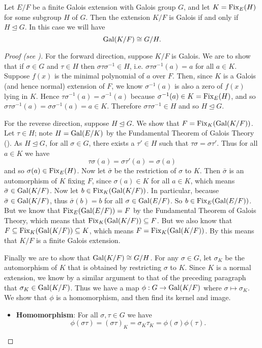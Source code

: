 \begin{theorem}\label{thrm-intermediate-field-that-is-galois-extension-of-base-field-iff-subgroup-is-normal}
    Let $E/F$ be a finite Galois extension with Galois group $G$, and let $K = \mathrm{Fix}_{E}(H)$ for some subgroup $H$ of $G$. Then the extension $K/F$ is Galois if and only if $H \unlhd G$. In this case we will have
    \[
        \mathrm{Gal}(K/F) \cong G/H.
    \]
\end{theorem}
\begin{proof}[Proof (see {\cite[Theorem 23.23, Statment 4]{judson_beezer_2022}})]
    For the forward direction, suppose $K/F$ is Galois. We are to show that if $\sigma \in G$ and $\tau \in H$ then $\sigma\tau\sigma^{-1} \in H$, i.e. $\sigma\tau\sigma^{-1}(a) = a$ for all $a \in K$. Suppose $f(x)$ is the minimal polynomial of $a$ over $F$. Then, since $K$ is a Galois (and hence normal) extension of $F$, we know $\sigma^{-1}(a)$ is also a zero of $f(x)$ lying in $K$. Hence $\tau\sigma^{-1}(a) = \sigma^{-1}(a)$ because $\sigma^{-1}(a) \in K = \mathrm{Fix}_{E}(H)$, and so $\sigma\tau\sigma^{-1}(a) = \sigma\sigma^{-1}(a) = a \in K$. Therefore $\sigma\tau\sigma^{-1} \in H$ and so $H \unlhd G$.

    For the reverse direction, suppose $H \unlhd G$. We show that $F = \mathrm{Fix}_{K}(\mathrm{Gal}(K/F))$. Let $\tau \in H$; note $H = \mathrm{Gal}(E/K)$ by the Fundamental Theorem of Galois Theory (). As $H \unlhd G$, for all $\sigma \in G$, there exists a $\tau' \in H$ such that $\tau\sigma = \sigma\tau'$. Thus for all $a \in K$ we have
    \[
        \tau\sigma(a) = \sigma\tau'(a) = \sigma(a)
    \]
    and so $\sigma(a) \in \mathrm{Fix}_{E}(H)$. Now let $\bar{\sigma}$ be the restriction of $\sigma$ to $K$. Then $\bar{\sigma}$ is an automorphism of $K$ fixing $F$, since $\sigma(a) \in K$ for all $a \in K$, which means $\bar{\sigma} \in \mathrm{Gal}(K/F)$. Now let $b \in \mathrm{Fix}_{K}(\mathrm{Gal}(K/F))$. In particular, because $\bar{\sigma} \in \mathrm{Gal}(K/F)$, thus $\bar{\sigma}(b) = b$ for all $\sigma \in \mathrm{Gal}(E/F)$. So $b \in \mathrm{Fix}_{E}(\mathrm{Gal}(E/F))$. But we know that $\mathrm{Fix}_{E}(\mathrm{Gal}(E/F)) = F$ by the Fundamental Theorem of Galois Theory, which means that $\mathrm{Fix}_{K}(\mathrm{Gal}(K/F)) \subseteq F$. But we also know that $F \subseteq \mathrm{Fix}_{K}(\mathrm{Gal}(K/F)) \subseteq K$, which means $F = \mathrm{Fix}_{K}(\mathrm{Gal}(K/F))$. By  this means that $K/F$ is a finite Galois extension.

    Finally we are to show that $\mathrm{Gal}(K/F) \cong G/H$. For any $\sigma \in G$, let $\sigma_K$ be the automorphism of $K$ that is obtained by restricting $\sigma$ to $K$. Since $K$ is a normal extension, we know by a similar argument to that of the preceding paragraph that $\sigma_K \in \mathrm{Gal}(K/F)$. Thus we have a map $\phi: G \to \mathrm{Gal}(K/F)$ where $\sigma \mapsto \sigma_K$. We show that $\phi$ is a homomorphism, and then find its kernel and image.
    \begin{itemize}
        \item \textbf{Homomorphism}: For all $\sigma, \tau \in G$ we have
        \[
            \phi(\sigma\tau) = (\sigma\tau)_K = \sigma_K\tau_K = \phi(\sigma)\phi(\tau).
        \]
        

\end{itemize}
\end{proof}
